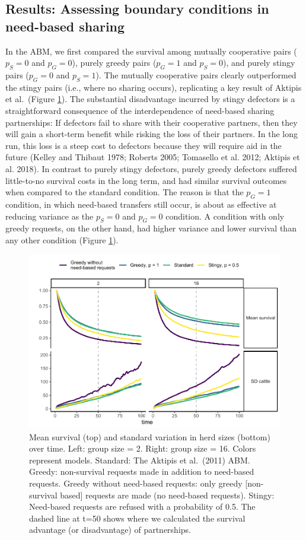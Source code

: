 \documentclass[
]{article}
\begin{document}
\subsection{Results: Assessing boundary conditions in need-based sharing}

In the ABM, we first compared the survival among mutually cooperative pairs (\(p_S=0\) and \(p_G=0\)), purely greedy pairs (\(p_G=1\) and \(p_S=0\)), and purely stingy pairs (\(p_G=0\) and \(p_S=1\)). The mutually cooperative pairs clearly outperformed the stingy pairs (i.e., where no sharing occurs), replicating a key result of Aktipis et al.~(Figure \ref{fig:abmplot0}). The substantial disadvantage incurred by stingy defectors is a straightforward consequence of the interdependence of need-based sharing partnerships: If defectors fail to share with their cooperative partners, then they will gain a short-term benefit while risking the loss of their partners. In the long run, this loss is a steep cost to defectors because they will require aid in the future (Kelley and Thibaut 1978; Roberts 2005; Tomasello et al. 2012; Aktipis et al. 2018). In contrast to purely stingy defectors, purely greedy defectors suffered little-to-no survival costs in the long term, and had similar survival outcomes when compared to the standard condition. The reason is that the \(p_G=1\) condition, in which need-based transfers still occur, is about as effective at reducing variance as the \(p_S=0\) and \(p_G=0\) condition. A condition with only greedy requests, on the other hand, had higher variance and lower survival than any other condition (Figure \ref{fig:abmplot0}).

\begin{figure}
\centering
\includegraphics{needBasedSharing-paper_files/figure-latex/abmplot0-1.pdf}
\caption{\label{fig:abmplot0}Mean survival (top) and standard variation in herd sizes (bottom) over time. Left: group size = 2. Right: group size = 16. Colors represent models. Standard: The Aktipis et al.~(2011) ABM. Greedy: non-survival requests made in addition to need-based requests. Greedy without need-based requests: only greedy {[}non-survival based{]} requests are made (no need-based requests). Stingy: Need-based requests are refused with a probability of 0.5. The dashed line at t=50 shows where we calculated the survival advantage (or disadvantage) of partnerships.}
\end{figure}
\end{document}
